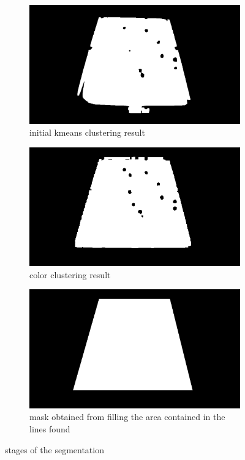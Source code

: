 \begin{figure}[h]
    \centering
    \begin{subfigure}[b]{0.4\textwidth}
    \includegraphics[width=\textwidth]{./imgs/kmeans_cluster.png}
    \caption{initial kmeans clustering result}
    \label{fig:kmeanstabol}
    \end{subfigure}
    \centering
    \begin{subfigure}[b]{0.4\textwidth}

    \includegraphics[width=\textwidth]{./imgs/color_cluster.png}
    \caption{color clustering result}
    \label{fig:colorsegtabol}
    \end{subfigure}
    \vspace{30pt}
    \begin{subfigure}[b]{0.4\textwidth}

    \includegraphics[width=\textwidth]{./imgs/maskfill.png}
    \caption{mask obtained from filling the area contained in the lines found}
    \label{fig:finalsegtabol}
    \end{subfigure}
    \caption{stages of the segmentation}
    \vspace{30pt}
\end{figure}

